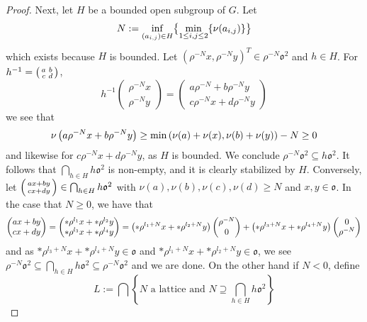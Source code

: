 \documentclass[draft]{amsart}
\begin{document}
\begin{proof}
        Next, let \(H\) be a bounded open subgroup of \(G\). Let 
        \[N:=\inf_{(a_{i,j})\in H} \bigl\{ \min_{1\le i,j \le 2}\{\nu(a_{i,j})\} \bigl\}\]
        which exists because \(H\) is bounded. Let \((\rho^{-N} x,\rho^{-N}y)^T\in \rho^{-N}\mathfrak o ^2\) and 
        \(h\in H\). For \(h^{-1}=\left( \begin{smallmatrix}
            a&b\\c&d
        \end{smallmatrix} \right)\),
        \[h^{-1}\begin{pmatrix}
            \rho^{-N}x\\\rho^{-N}y
        \end{pmatrix}=\begin{pmatrix}
            a\rho^{-N}+b\rho^{-N}y\\c\rho^{-N}x+d\rho^{-N}y
        \end{pmatrix}\]
        we see that
        \[\nu\left( a\rho^{-N}x+b\rho^{-N}y \right)\ge \min\left( \nu(a)+\nu(x),\nu(b)+\nu(y) \right)-N\ge 0\]
        and likewise for \(c\rho^{-N}x+d\rho^{-N}y\), as \(H\) is bounded. We conclude \(\rho^{-N}\mathfrak o ^2\subseteq h\mathfrak o^2\).
        It follows that \(\bigcap_{h\in H}h\mathfrak o^2\) is non-empty, and it is clearly stabilized by \(H\). Conversely, let \(\left( \begin{smallmatrix} ax+by\\cx+dy \end{smallmatrix} \right)\in \bigcap_{h\in H}h\mathfrak o^2\) with \(\nu(a),\nu(b),\nu(c),\nu(d)\ge N\) and \(x,y\in \mathfrak o\). In the case that \(N\ge 0\), we have that
        \[\begin{pmatrix}ax+by\\cx+dy\end{pmatrix}=\begin{pmatrix}*\rho^{l_1}x+*\rho^{l_2}y\\ *\rho^{l_3}x+*\rho^{l_4}y\end{pmatrix}=\left( *\rho^{l_1+N}x+*\rho^{l_2+N}y \right)\begin{pmatrix}
            \rho^{-N}\\0
        \end{pmatrix}+\left( *\rho^{l_3+N}x+*\rho^{l_4+N}y \right)\begin{pmatrix}
            0\\ \rho^{-N}
        \end{pmatrix}\]
        and as \(*\rho^{l_3+N}x+*\rho^{l_4+N}y\in \mathfrak o\) and \(*\rho^{l_1+N}x+*\rho^{l_2+N}y\in \mathfrak o\), we see \(\rho^{-N}\mathfrak o^2 \subseteq \bigcap_{h\in H}h\mathfrak o^2\subseteq \rho^{-N}\mathfrak o ^2\) and we are done. On the other hand if \(N<0\), define 
        \[L:=\bigcap\left\{N \text{ a lattice and }N\supseteq \bigcap_{h\in H}h\mathfrak o^2\right\}\]
    \end{proof}
\end{document}
